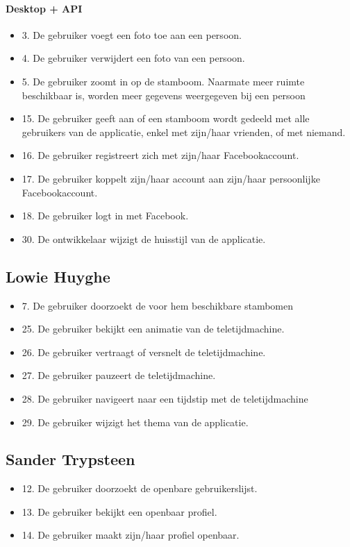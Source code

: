 \documentclass[pdftex,a4paper,12pt,twoside]{report}
\begin{document}
\paragraph{Desktop + API}
\begin{itemize}
\item 3. De gebruiker voegt een foto toe aan een persoon. 
\item 4. De gebruiker verwijdert een foto van een persoon.
\item 5. De gebruiker zoomt in op de stamboom. Naarmate meer ruimte beschikbaar is, worden meer 
gegevens weergegeven bij een persoon
\item 15. De gebruiker geeft aan of een stamboom wordt gedeeld met alle gebruikers van de applicatie, 
enkel met zijn/haar vrienden, of met niemand. 
\item 16. De gebruiker registreert zich met zijn/haar Facebookaccount. 
\item 17. De gebruiker koppelt zijn/haar account aan zijn/haar persoonlijke Facebookaccount. 
\item 18. De gebruiker logt in met Facebook. 
\item 30. De ontwikkelaar wijzigt de huisstijl van de applicatie.
\end{itemize}
 
\subsection{Lowie Huyghe}
\begin{itemize}
\item 7. De gebruiker doorzoekt de voor hem beschikbare stambomen
\item 25. De gebruiker bekijkt een animatie van de teletijdmachine. 
\item 26. De gebruiker vertraagt of versnelt de teletijdmachine. 
\item 27. De gebruiker pauzeert de teletijdmachine. 
\item 28. De gebruiker navigeert naar een tijdstip met de teletijdmachine
\item 29. De gebruiker wijzigt het thema van de applicatie.
\end{itemize}

\subsection{Sander Trypsteen}
\begin{itemize}
\item 12. De gebruiker doorzoekt de openbare gebruikerslijst. 
\item 13. De gebruiker bekijkt een openbaar profiel. 
\item 14. De gebruiker maakt zijn/haar profiel openbaar. 
\end{itemize}
\end{document}
